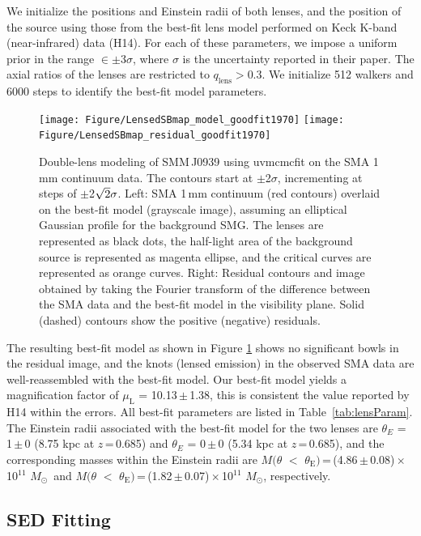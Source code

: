 \documentclass[twocolumn,apj,numberedappendix]{emulateapj}
\newcommand{\Msun}{\mbox{$M_{\odot}$}}
\begin{document}
We initialize the positions and Einstein radii of both lenses, and the position of the source using those
 from the best-fit lens model performed on Keck K-band (near-infrared) data (H14). For each of
these parameters, we impose a uniform prior in the range $\in\pm$3$\sigma$, where $\sigma$ is the uncertainty
reported in their paper. The axial ratios of the lenses are restricted to $q_\textrm{lens} > 0.3$. We initialize 512
walkers and 6000 steps to identify the best-fit model parameters.
\begin{figure}[!tbpH]
\centering
\texttt{[image: Figure/LensedSBmap\_model\_goodfit1970]}
\texttt{[image: Figure/LensedSBmap\_residual\_goodfit1970]}
\caption{Double-lens modeling of SMM\,J0939 using {\sc uvmcmcfit} on the SMA 1\,mm continuum data.
The contours start at $\pm$2$\sigma$, incrementing at
steps of $\pm$2$\sqrt{\rm 2}\sigma$. Left: SMA 1\,mm continuum (red contours) overlaid on the best-fit model (grayscale image), assuming an elliptical Gaussian profile for the background SMG. The lenses are represented as black dots, the half-light area of the background source is represented as magenta ellipse, and the critical curves are represented as orange curves.
Right: Residual contours and image obtained by taking the Fourier transform of the difference between the SMA data and the best-fit model in the visibility plane. Solid (dashed) contours show the positive (negative) residuals.\label{fig:lens}}
\end{figure}

The resulting best-fit model as shown in Figure\,\,\ref{fig:lens} shows no significant bowls in the residual
image, and the knots (lensed emission) in the observed SMA data are well-reassembled with the best-fit model.
Our best-fit model yields a magnification
factor of $\mu_\textrm{L}$ = 10.13\,$\pm$\,1.38, this is consistent the value reported by H14 within the errors. All best-fit
parameters are listed in Table~\ref{tab:lensParam}. The Einstein radii associated with the best-fit model for the two lenses are $\theta_{E}$ = 1\,$\pm$\,0 (8.75 kpc at $z$\,=\,0.685) and $\theta_{E}$ = 0\,$\pm$\,0 (5.34\,\,kpc at $z$\,=\,0.685), and
the corresponding masses within the Einstein radii are $M(\theta$\,\,$<$\,\,$\theta_\textrm{E})$\,=\,(4.86\,$\pm$\,0.08)\,$\times$\,10$^{11}$\,\,\Msun\ and $M(\theta$\,\,$<$\,\,$\theta_\textrm{E})$\,=\,(1.82\,$\pm$\,0.07)\,$\times$\,10$^{11}$\,\,\Msun, respectively.
%

\subsection{SED Fitting} \label{sec:SED}
\end{document}
